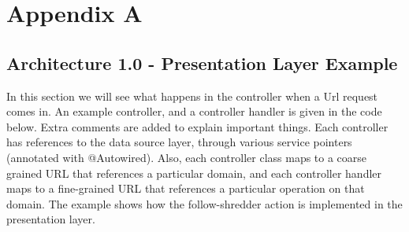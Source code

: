 \chapter{Appendix A}
\section{Architecture 1.0 - Presentation Layer Example}
\label{sec:apres}
In this section we will see what happens in the controller when a Url request comes in. An example controller, and a controller handler is given in the code below. Extra comments are added to explain important things. Each controller has references to the data source layer, through various service pointers (annotated with @Autowired). Also, each controller class maps to a coarse grained URL that references a particular domain, and each controller handler maps to a fine-grained URL that references a particular operation on that domain. The example shows how the follow-shredder action is implemented in the presentation layer.
		
